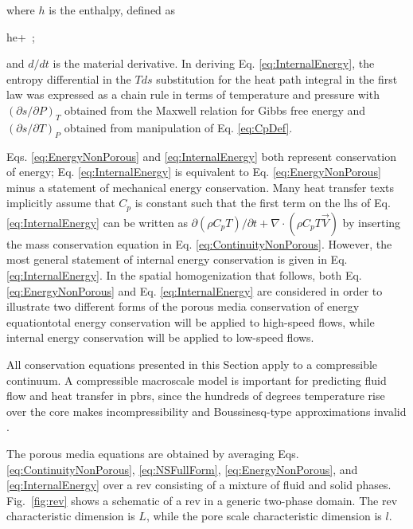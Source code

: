 \noindent where \(h\) is the enthalpy, defined as

\beq
\label{eq:EnthalpyDef}
h\equiv e+\ ;
\eeq

\noindent and \(d/dt\) is the material derivative. In deriving Eq. \eqref{eq:InternalEnergy}, the entropy differential in the \(Tds\) substitution for the heat path integral in the first law was expressed as a chain rule in terms of temperature and pressure with \((\partial s/\partial P)_T\) obtained from the Maxwell relation for Gibbs free energy and \((\partial s/\partial T)_P\) obtained from manipulation of Eq. \eqref{eq:CpDef}. 

Eqs. \eqref{eq:EnergyNonPorous} and \eqref{eq:InternalEnergy} both represent conservation of energy; Eq. \eqref{eq:InternalEnergy} is equivalent to Eq. \eqref{eq:EnergyNonPorous} minus a statement of mechanical energy conservation. Many heat transfer texts implicitly assume that \(C_p\) is constant such that the first term on the \gls{lhs} of Eq. \eqref{eq:InternalEnergy} can be written as \(\partial(\rho C_{p}T)/\partial t+\nabla\cdot(\rho C_pT\vec{V})\) by inserting the mass conservation equation in Eq. \eqref{eq:ContinuityNonPorous}. However, the most general statement of internal energy conservation is given in Eq. \eqref{eq:InternalEnergy}. In the spatial homogenization that follows, both Eq. \eqref{eq:EnergyNonPorous} and Eq. \eqref{eq:InternalEnergy} are considered in order to illustrate two different forms of the porous media conservation of energy equation\mdash total energy conservation will be applied to high-speed flows, while internal energy conservation will be applied to low-speed flows.

All conservation equations presented in this Section apply to a compressible continuum. A compressible macroscale model is important for predicting fluid flow and heat transfer in \glspl{pbr}, since the hundreds of degrees temperature rise over the core makes incompressibility and Boussinesq-type approximations invalid \cite{elmo}. 

The porous media equations are obtained by averaging Eqs. \eqref{eq:ContinuityNonPorous}, \eqref{eq:NSFullForm}, \eqref{eq:EnergyNonPorous}, and \eqref{eq:InternalEnergy} over a \gls{rev} consisting of a mixture of fluid and solid phases. Fig.\ \ref{fig:rev} shows a schematic of a \gls{rev} in a generic two-phase domain. The \gls{rev} characteristic dimension is \(L\), while the pore scale characteristic dimension is \(l\).


